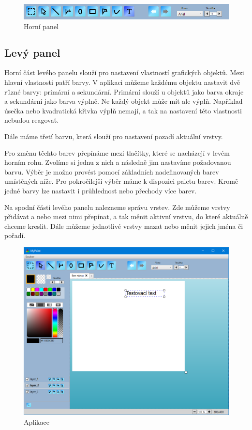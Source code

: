 \documentclass[
  field=inf,
  biblatex,
  glossaries,
  index
]{kidiplom}
\begin{document}
\begin{figure}
\includegraphics[width=16cm]{img/toppanel}
\caption{Horní panel}
\end{figure}


\subsection{Levý panel}

Horní část levého panelu slouží pro nastavení vlastností grafických objektů. Mezi hlavní vlastnosti patří barvy. V aplikaci můžeme každému objektu nastavit dvě různé barvy: primární a sekundární. Primární slouží u objektů jako barva okraje a sekundární jako barva výplně. Ne každý objekt může mít ale výplň. Například úsečka nebo kvadratická křivka výplň nemají, a tak na nastavení této vlastnosti nebudou reagovat. 

Dále máme třetí barvu, která slouží pro nastavení pozadí aktuální vrstvy.

Pro změnu těchto barev přepínáme mezi tlačítky, které se nacházejí v  levém horním rohu. Zvolíme si jednu z nich a následně jim nastavíme požadovanou barvu. Výběr je možno provést pomocí základních nadefinovaných barev umístěných níže. Pro pokročilejší výběr máme k dispozici paletu barev. Kromě jedné barvy lze nastavit i průhlednost nebo přechody více barev.

Na spodní části levého panelu nalezneme správu vrstev. Zde můžeme vrstvy přidávat a nebo mezi nimi přepínat, a tak měnit aktivní vrstvu, do které aktuálně chceme kreslit. Dále můžeme jednotlivé vrstvy mazat nebo měnit jejich jména či pořadí.

\begin{figure}
\includegraphics[width=15cm]{img/program}
\caption{Aplikace}
\end{figure}  
\end{document}
